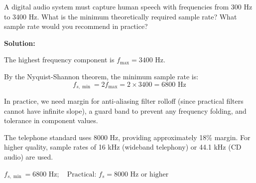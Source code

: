 \begin{example}
\label{ex:audio_sample_rate}
A digital audio system must capture human speech with frequencies from 300 Hz to 3400 Hz. What is the minimum theoretically required sample rate? What sample rate would you recommend in practice?

\textbf{Solution:}

The highest frequency component is $f_{\max} = 3400$ Hz.

By the Nyquist-Shannon theorem, the minimum sample rate is:
\begin{equation*}
f_{s,\min} = 2 f_{\max} = 2 \times 3400 = 6800 \text{ Hz}
\end{equation*}

In practice, we need margin for anti-aliasing filter rolloff (since practical filters cannot have infinite slope), a guard band to prevent any frequency folding, and tolerance in component values.

The telephone standard uses 8000 Hz, providing approximately 18\% margin. For higher quality, sample rates of 16 kHz (wideband telephony) or 44.1 kHz (CD audio) are used.

$\boxed{f_{s,\min} = 6800 \text{ Hz}; \quad \text{Practical: } f_s = 8000 \text{ Hz or higher}}$
\end{example}


